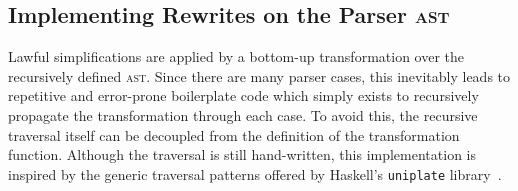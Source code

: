 \documentclass[../../../main.tex]{subfiles}
\begin{document}
\subsection{Implementing Rewrites on the Parser \textsc{ast}}\label{sec:parser-rewrites}
Lawful simplifications are applied by a bottom-up transformation over the recursively defined  \textsc{ast}.
Since there are many parser cases, this inevitably leads to repetitive and error-prone boilerplate code which simply exists to recursively propagate the transformation through each case.
To avoid this, the recursive traversal itself can be decoupled from the definition of the transformation function.
Although the traversal is still hand-written, this implementation is inspired by the generic traversal patterns offered by Haskell's \texttt{uniplate} library~\cite{mitchell_uniform_2007}.
\end{document}
